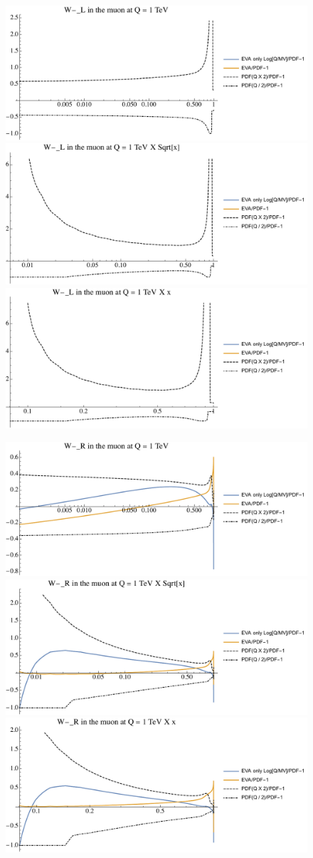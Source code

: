 \documentclass[a4paper,11pt]{article}
\begin{document}
\begin{figure}[ht]
\includegraphics[width=0.4\linewidth]{PlotPDFs/ratios/1TeV/W-_L_Q.pdf}
\includegraphics[width=0.4\linewidth]{PlotPDFs/ratios/1TeV/W-_L_Qsqrtx.pdf}
\includegraphics[width=0.4\linewidth]{PlotPDFs/ratios/1TeV/W-_L_Qx.pdf}
\end{figure}

\begin{figure}[ht]
\includegraphics[width=0.4\linewidth]{PlotPDFs/ratios/1TeV/W-_R_Q.pdf}
\includegraphics[width=0.4\linewidth]{PlotPDFs/ratios/1TeV/W-_R_Qsqrtx.pdf}
\includegraphics[width=0.4\linewidth]{PlotPDFs/ratios/1TeV/W-_R_Qx.pdf}
\end{figure}
\end{document}
